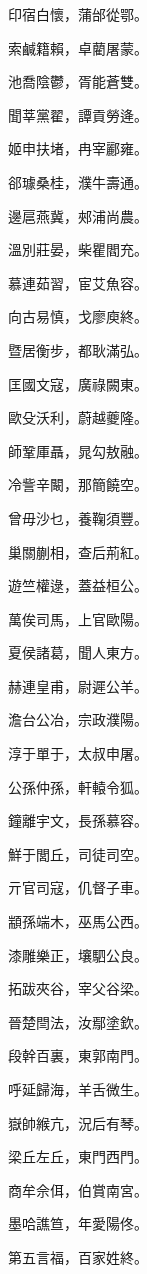 \documentclass[12pt,a4paper]{ctexbook}
\begin{document}
印宿白懷，蒲邰從鄂。\par
索鹹籍賴，卓藺屠蒙。\par
池喬陰鬱，胥能蒼雙。\par
聞莘黨翟，譚貢勞逄。\par
姬申扶堵，冉宰酈雍。\par
郤璩桑桂，濮牛壽通。\par
邊扈燕冀，郟浦尚農。\par
溫別莊晏，柴瞿閻充。\par
慕連茹習，宦艾魚容。\par
向古易慎，戈廖庾終。\par
暨居衡步，都耿滿弘。\par
匡國文寇，廣祿闕東。\par
歐殳沃利，蔚越夔隆。\par
師鞏厙聶，晁勾敖融。\par
冷訾辛闞，那簡饒空。\par
曾毋沙乜，養鞠須豐。\par
巢關蒯相，查后荊紅。\par
遊竺權逯，蓋益桓公。\par
萬俟司馬，上官歐陽。\par
夏侯諸葛，聞人東方。\par
赫連皇甫，尉遲公羊。\par
澹台公冶，宗政濮陽。\par
淳于單于，太叔申屠。\par
公孫仲孫，軒轅令狐。\par
鐘離宇文，長孫慕容。\par
鮮于閭丘，司徒司空。\par
亓官司寇，仉督子車。\par
顓孫端木，巫馬公西。\par
漆雕樂正，壤駟公良。\par
拓跋夾谷，宰父谷梁。\par
晉楚閆法，汝鄢塗欽。\par
段幹百裏，東郭南門。\par
呼延歸海，羊舌微生。\par
嶽帥緱亢，況后有琴。\par
梁丘左丘，東門西門。\par
商牟佘佴，伯賞南宮。\par
墨哈譙笪，年愛陽佟。\par
第五言福，百家姓終。\par
\end{document}

